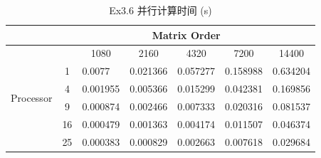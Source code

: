 \documentclass[UTF8]{article}
\begin{document}
\begin{table}[h]
    \caption{Ex3.6 并行计算时间 (s)}
    \label{tab:my-table}
    \centering
    \scalebox{0.8} {
    \begin{tabular}{|c|c|l|l|l|l|l|}
    \hline
    \multicolumn{1}{|l|}{}     & \multicolumn{6}{c|}{Matrix Order}                                                                                                                                  \\ \hline
    \multirow{6}{*}{Processor} & \multicolumn{1}{l|}{} & \multicolumn{1}{c|}{1080} & \multicolumn{1}{c|}{2160} & \multicolumn{1}{c|}{4320} & \multicolumn{1}{c|}{7200} & \multicolumn{1}{c|}{14400} \\ \cline{2-7} 
                               & 1                     & 0.0077                    & 0.021366                  & 0.057277                  & 0.158988                  & 0.634204                   \\ \cline{2-7} 
                               & 4                     & 0.001955                  & 0.005366                  & 0.015299                  & 0.042381                  & 0.169856                   \\ \cline{2-7} 
                               & 9                     & 0.000874                  & 0.002466                  & 0.007333                  & 0.020316                  & 0.081537                   \\ \cline{2-7} 
                               & 16                    & 0.000479                  & 0.001363                  & 0.004174                  & 0.011507                  & 0.046374                   \\ \cline{2-7} 
                               & 25                    & 0.000383                  & 0.000829                  & 0.002663                  & 0.007618                  & 0.029684                   \\ \hline
    \end{tabular}}
    \end{table}
\end{document}
